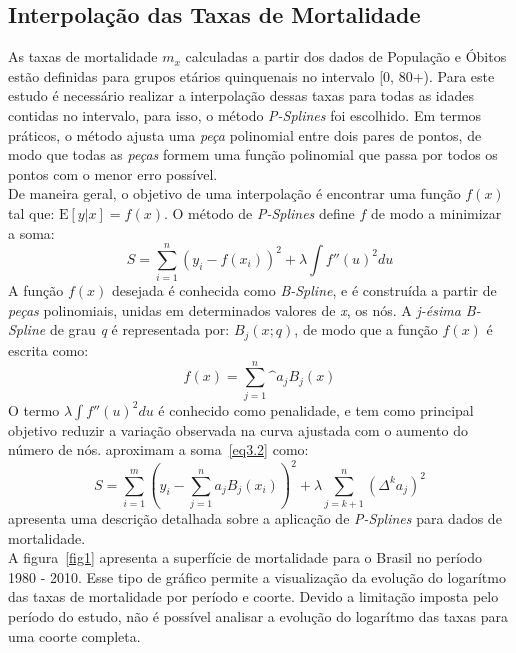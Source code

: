 \documentclass[12pt, 						%
			openright, 					%
			twoside,					%
			a4paper,x					%
			english,					%
			brazil]{abntex2}				%
\begin{document}
		\subsection{Interpolação das Taxas de Mortalidade \label{sec3.1.2}}
		As taxas de mortalidade $m_{x}$ calculadas a partir dos dados de População e Óbitos estão definidas para grupos etários quinquenais no intervalo [0, 80+). Para este estudo é necessário realizar a interpolação dessas taxas para todas as idades contidas no intervalo, para isso, o método \textit{P-Splines} foi escolhido. Em termos práticos, o método ajusta uma \textit{peça} polinomial entre dois pares de pontos, de modo que todas as \textit{peças} formem uma função polinomial que passa por todos os pontos com o menor erro possível. \\
		De maneira geral, o objetivo de uma interpolação é encontrar uma função $f(x)$ tal que: $\mathrm{E}[y|x] = f(x)$. O método de \textit{P-Splines} define $f$ de modo a minimizar a soma:
		\begin{equation} \label{eq3.2}
			S = \sum_{i = 1}^{n}(y_{i}-f(x_{i}))^{2} + \lambda\int{f''(u)}^{2}du
		\end{equation}
		A função $f(x)$ desejada é conhecida como \textit{B-Spline}, e é construída a partir de \textit{peças} polinomiais, unidas em determinados valores de \textit{x}, os nós. A \textit{j-ésima B-Spline} de grau \textit{q} é representada por: $B_{j}(x;q)$, de modo que a função $f(x)$ é escrita como: 
		\begin{equation} \label{eq3.3}
			f(x) = \sum_{j = 1}^{n} \^a_{j}B_{j}(x)
		\end{equation}
		O termo $\lambda\int{f''(u)}^{2}du$ é conhecido como penalidade, e tem como principal objetivo reduzir a variação observada na curva ajustada com o aumento do número de nós.  aproximam a soma~\ref{eq3.2} como:
		\begin{equation} \label{eq3.4}
			S = \sum_{i = 1}^{m}\left(y_{i}-\sum_{j = 1}^{n}a_{j}B_{j}(x_{i})\right)^{2} + \lambda\sum_{j = k+1}^{n}(\Delta^{k}a_{j})^{2}
		\end{equation}
		 apresenta uma descrição detalhada sobre a aplicação de \textit{P-Splines} para dados de mortalidade. \\
		A figura~\ref{fig1} apresenta a superfície de mortalidade para o Brasil no período 1980 - 2010. Esse tipo de gráfico permite a visualização da evolução do logarítmo das taxas de mortalidade por período e coorte. Devido a limitação imposta pelo período do estudo, não é possível analisar a evolução do logarítmo das taxas para uma coorte completa. \\
\end{document}
